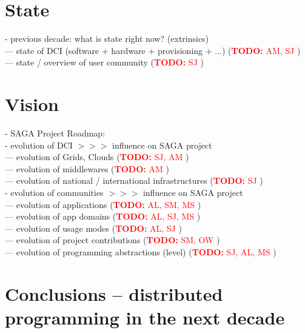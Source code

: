 \documentclass{article}
\newcommand{\B}[1]{\textbf{#1}}
\newcommand{\nind}{\noindent}
\newcommand{\todo}[1]{{\textcolor{red}{\B{TODO:} #1 }}}
\begin{document}
\section{State}

    \nind
    - previous decade: what is state right now? (extrinsics)\\
    --- state of DCI (software + hardware + provisioning + ...) (\todo{AM, SJ})\\
    --- state / overview of user community (\todo{SJ})\\


\section{Vision}

    \nind
    - SAGA Project Roadmap:\\

     
  
    \nind
    - evolution of DCI $>>>$ influence on SAGA project\\
    --- evolution of Grids, Clouds (\todo{SJ, AM})\\
    --- evolution of middlewares (\todo{AM})\\
    --- evolution of national / international infrastructures (\todo{SJ})\\
  
    \nind
    - evolution of communities  $>>>$ influence on SAGA project\\
    --- evolution of applications (\todo{AL, SM, MS})\\
    --- evolution of app domains (\todo{AL, SJ, MS})\\
    --- evolution of usage modes (\todo{AL, SJ})\\
    --- evolution of project contributions (\todo{SM, OW})\\
    --- evolution of programming abstractions (level) (\todo{SJ, AL, MS})\\


\section{Conclusions -- distributed programming in the next decade}

\footnotesize


\end{document}

